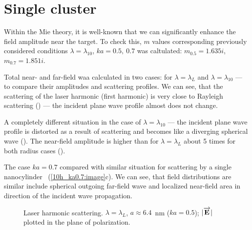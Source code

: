 \section{Single cluster}

Within the Mie theory, it is well-known that we can significantly enhance the field amplitude near the target. To check this, $m$ values corresponding previously considered conditions $\lambda = \lambda_{10}$, $ka = 0.5,\:0.7$ was caltulated: $m_{0.5} = 1.635i$, $m_{0.7} = 1.851i$.

Total near- and far-field waa calculated in two cases: for $\lambda = \lambda_{L}$ and $\lambda = \lambda_{10}$ --- to compare their amplitudes and scattering profiles. We can see, that the scattering of the laser harmonic (first harmonic) is very close to Rayleigh scattering () --- the incident plane wave profile almost does not change. %

A completely different situation in the case of $\lambda = \lambda_{10}$ --- the incident plane wave profile is distorted as a result of scattering and becomes like a diverging spherical wave (). The near-field amplitude is higher than for $\lambda = \lambda_{L}$ about 5 times for both radius cases (). %

The case $ka = 0.7$ compared with similar situation for scattering by a single nanocylinder~\cite{andreev_lecz} (\autoref{10h_ka0.7:image}c). We can see, that field distributions are similar include spherical outgoing far-field wave and localized near-field area in direction of the incident wave propagation.

    \begin{figure}[H]
        \hfil
        \caption{Laser harmonic scattering. $\lambda = \lambda_{L}$, $a \approx 6.4$~nm ($ka = 0.5$); $|\overrightarrow{\textbf{E}_{}}|$ plotted in the plane of polarization.}
        \label{1h_ka0.5:image}
    \end{figure}

